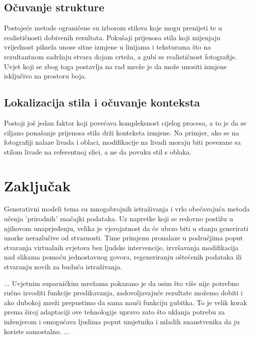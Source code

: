 \documentclass[lmodern, utf8, seminar]{fer}
\begin{document}
\section{Očuvanje strukture}
Postojeće metode ograničene su izborom stilova koje mogu prenijeti te u realističnosti dobivenih rezultata. Pokušaji prijenosa stila koji mijenjaju vrijednost piksela unose sitne izmjene u linijama i teksturama što na rezultantnom sadržaju stvara dojam crteža, a gubi se realističnost fotografije. Uvjet koji se zbog toga postavlja na rad mreže je da može unositi izmjene isključivo na prostoru boja.

\section{Lokalizacija stila i očuvanje konteksta} \cite{luan2017deep}
Postoji još jedan faktor koji povećava kompleksnost cijelog procesa, a to je da se ciljano ponašanje prijenosa stila drži konteksta izmjene. Na primjer, ako se na fotografiji nalaze livada i oblaci, modifikacije na livadi moraju biti povezane sa stilom livade na referentnoj slici, a ne da povuku stil s oblaka. 




\chapter{Zaključak}
Generativni modeli tema su mnogobrojnih istraživanja i vrlo obećavajuća metoda učenja 'prirodnih' značajki podataka. Uz napretke koji se redovno postižu u njihovom unaprjeđenju, velika je vjerojatnost da će ubrzo biti u stanju generirati uzorke nerazlučive od stvarnosti. Time primjenu pronalaze u područjima poput stvaranja virtualnih svjetova bez ljudske intervencije, izvršavanja modifikacija nad slikama pomoću jednostavnog govora, regeneriranju oštećenih podataka ili stvaranju novih za buduća istraživanja.
\newline

...
Uvjetnim suparničkim mrežama pokazano je da osim što više nije potrebno ručno izvoditi funkcije preslikavanja, zadovoljavajuće rezultate možemo dobiti i ako dubokoj mreži prepustimo da sama nauči funkciju gubitka. To je velik korak prema široj adaptaciji ove tehnologije upravo zato što uklanja potrebu za inženjerom i omogućava ljudima poput umjetnika i mladih znanstvenika da ju koriste samostalno.
...
\newline



\end{document}
